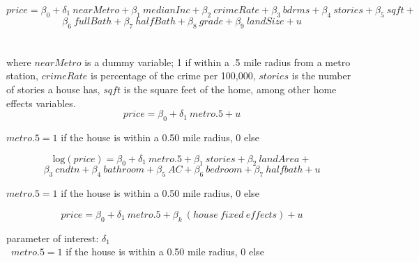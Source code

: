 \documentclass[12pt]{report}
\newcommand\tab[1][.50cm]{\hspace*{#1}}
\begin{document}
$$price = \beta_0 +\delta_1\ nearMetro + \beta_1\ medianInc + \beta_2\ crimeRate + \beta_3\ bdrms + \beta_4\ stories + \beta_5\ sqft +$$$$ \beta_6\ fullBath + \beta_7\ halfBath + \beta_8\ grade + \beta_9\ landSize + u$$\\\\
where $nearMetro$ is a dummy variable; 1 if within a .5 mile radius from a metro station, $crimeRate$ is percentage of the crime per 100,000, $stories$ is the number of stories a house has, $sqft$ is the square feet of the home, among other home effects variables. \\


$$price = \beta_0 +\delta_1\ metro.5  + u$$
\bigskip
\bigskip

$metro.5=1$ if the house is within a 0.50 mile radius, 0 else



\bigskip
\bigskip
\bigskip
\bigskip

$$\text{log}(price) = \beta_0 +\delta_1\ metro.5  + \beta_1\ stories + \beta_2\ landArea + $$$$\beta_3\ cndtn + \beta_4\ bathroom + \beta_5\ AC + \beta_6\ bedroom + \beta_7\ halfbath + u $$

\bigskip
\bigskip
$metro.5=1$ if the house is within a 0.50 mile radius, 0 else




$$price = \beta_0 +\delta_1\ metro.5 + \beta_k\ (house\ fixed\ effects )+ u$$
\bigskip
\bigskip

parameter of interest: $\delta_1$\\
\tab \  $metro.5=1$ if the house is within a 0.50 mile radius, 0 else
\end{document}
